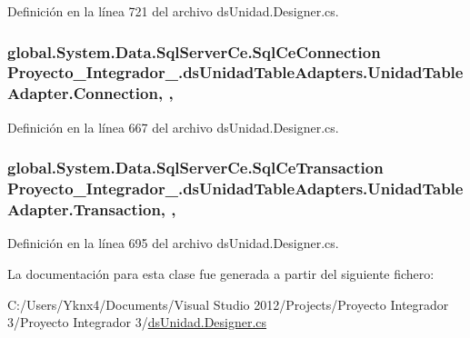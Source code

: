 Definición en la línea 721 del archivo ds\-Unidad.\-Designer.\-cs.

\hypertarget{class_proyecto___integrador__3_1_1ds_unidad_table_adapters_1_1_unidad_table_adapter_a13a9c13fd0ce4e17d7f35891158864db}{
\subsubsection[{Connection}]{\setlength{\rightskip}{0pt plus 5cm}global.\-System.\-Data.\-Sql\-Server\-Ce.\-Sql\-Ce\-Connection Proyecto\-\_\-\-Integrador\-\_.\-ds\-Unidad\-Table\-Adapters.\-Unidad\-Table\-Adapter.\-Connection\hspace{0.3cm}{\ttfamily [get]}, {\ttfamily [set]}, {\ttfamily [package]}}}\label{class_proyecto___integrador__3_1_1ds_unidad_table_adapters_1_1_unidad_table_adapter_a13a9c13fd0ce4e17d7f35891158864db}


Definición en la línea 667 del archivo ds\-Unidad.\-Designer.\-cs.

\hypertarget{class_proyecto___integrador__3_1_1ds_unidad_table_adapters_1_1_unidad_table_adapter_a4bb3adb0822427867564cf7559b226cf}{
\subsubsection[{Transaction}]{\setlength{\rightskip}{0pt plus 5cm}global.\-System.\-Data.\-Sql\-Server\-Ce.\-Sql\-Ce\-Transaction Proyecto\-\_\-\-Integrador\-\_.\-ds\-Unidad\-Table\-Adapters.\-Unidad\-Table\-Adapter.\-Transaction\hspace{0.3cm}{\ttfamily [get]}, {\ttfamily [set]}, {\ttfamily [package]}}}\label{class_proyecto___integrador__3_1_1ds_unidad_table_adapters_1_1_unidad_table_adapter_a4bb3adb0822427867564cf7559b226cf}


Definición en la línea 695 del archivo ds\-Unidad.\-Designer.\-cs.



La documentación para esta clase fue generada a partir del siguiente fichero\-:\begin{DoxyCompactItemize}
\item 
C\-:/\-Users/\-Yknx4/\-Documents/\-Visual Studio 2012/\-Projects/\-Proyecto Integrador 3/\-Proyecto Integrador 3/\hyperlink{ds_unidad_8_designer_8cs}{ds\-Unidad.\-Designer.\-cs}\end{DoxyCompactItemize}
